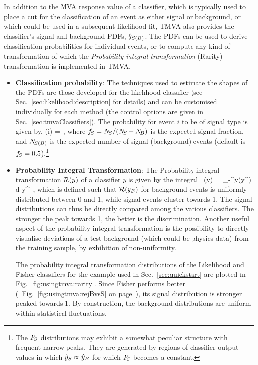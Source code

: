 In addition to the MVA response value \yMVA of a classifier, which is
typically used to place a cut for the classification of an event as
either signal or background, or which could be used in a subsequent
likelihood fit, TMVA also provides the classifier's signal and
background PDFs, ${\hat y}_{S(B)}$. The PDFs can be used to derive
classification probabilities for individual events, or to compute any
kind of transformation of which the {\em Probability integral transformation} (Rarity) transformation is
implemented in TMVA.
\begin{itemize}

\item {\bf Classification probability}: The techniques used to estimate the shapes of the PDFs
  are those developed for the likelihood classifier (see
  Sec.~\ref{sec:likelihood:description} for details) and can be
  customised individually for each method (the control options are
  given in Sec.~\ref{sec:tmvaClassifiers}).  The probability for event
  $i$ to be of signal type is given by, \beq
      \label{eq:proba}
         \proba(i) = \,, \eeq where $ f_{\!S}= N_{\!S}/( N_{\!S}+ N_{\!B})$ is
         the expected signal fraction, and $ N_{\!S(B)}$ is the expected
         number of signal (background) events (default is
         $ f_{\!S}=0.5$).\footnote { The $ P_{\!S}$ distributions may exhibit
           a somewhat peculiar structure with frequent narrow
           peaks. They are generated by regions of classifier output
           values in which ${\hat y}_{S}\propto{\hat y}_{B}$ for which $ P_{\!S}$
           becomes a constant.  }

\item {\bf Probability Integral Transformation}: 
      The Probability integral transformation $\Rarity(y)$ of a classifier $y$ is given by the integral~\cite{Rarity}
      \beq
      \label{eq:rarity}
          \Rarity(y) = \intl_{-\infty}^{y}\yPDFB(y^\prime)\,d
          y^\prime~, \eeq which is defined such that $\Rarity(y_B)$
          for background events is uniformly distributed between 0 and
          1, while signal events cluster towards 1. The signal
          distributions can thus be directly compared among the
          various classifiers.  The stronger the peak towards 1, the
          better is the discrimination. Another useful aspect of the
          probability integral transformation is the possibility to directly visualise deviations
          of a test background (which could be physics data) from the
          training sample, by exhibition of non-uniformity.
      
      The probability integral transformation distributions of the Likelihood and Fisher classifiers for the example 
      used in Sec.~\ref{sec:quickstart}
      are plotted in Fig.~\ref{fig:usingtmva:rarity}. Since Fisher performs better
      (\cf\  Fig.~\ref{fig:usingtmva:rejBvsS} on page~\pageref{fig:usingtmva:rejBvsS}),
      its signal distribution is stronger peaked towards 1. By construction, the 
      background distributions are uniform within statistical fluctuations.

\end{itemize}
